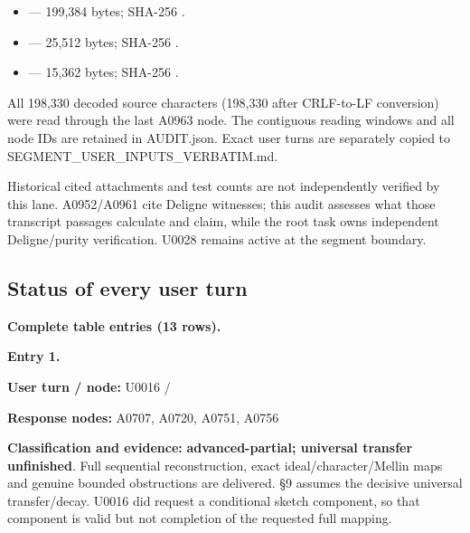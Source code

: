 \documentclass[10pt,a4paper,oneside]{report}
\providecommand{\tightlist}{\setlength{\itemsep}{0pt}\setlength{\parskip}{0pt}}
\begin{document}
\begin{itemize}
\tightlist
\item
  \protect{}
  --- 199,384 bytes; SHA-256
  \protect{}.
\item
  \protect{}
  --- 25,512 bytes; SHA-256
  \protect{}.
\item
  \protect{} ---
  15,362 bytes; SHA-256
  \protect{}.
\end{itemize}

All 198,330 decoded source characters (198,330 after CRLF-to-LF
conversion) were read through the last A0963 node. The contiguous
reading windows and all node IDs are retained in AUDIT.json. Exact user
turns are separately copied to SEGMENT\_USER\_INPUTS\_VERBATIM.md.

Historical cited attachments and test counts are not independently
verified by this lane. A0952/A0961 cite Deligne witnesses; this audit
assesses what those transcript passages calculate and claim, while the
root task owns independent Deligne/purity verification. U0028 remains
active at the segment boundary.

\subsection{Status of every user turn}\label{status-of-every-user-turn}

\textbf{Complete table entries (13 rows).}


\textbf{Entry 1.}

\textbf{User turn / node:} U0016 /
\protect{}

\textbf{Response nodes:} A0707, A0720, A0751, A0756

\textbf{Classification and evidence:} \textbf{advanced-partial;
universal transfer unfinished}. Full sequential reconstruction, exact
ideal/character/Mellin maps and genuine bounded obstructions are
delivered. §9 assumes the decisive universal transfer/decay. U0016 did
request a conditional sketch component, so that component is valid but
not completion of the requested full mapping.
\end{document}
